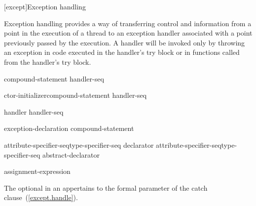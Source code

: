 [except]{Exception handling}%


%

\pnum
Exception handling provides a way of transferring control and information
from a point in the execution of a thread to an exception handler
associated with a point previously passed by the execution.
A handler will be invoked only by throwing an exception
in code executed in the handler's try block
or in functions called from the handler's try block.

%
%
\begin{bnf}
\br
     compound-statement handler-seq
\end{bnf}

%
%
\begin{bnf}
\br
     ctor-initializer\opt compound-statement handler-seq
\end{bnf}

\begin{bnf}
\br
    handler handler-seq\opt
\end{bnf}

%
%
\begin{bnf}
\br
     exception-declaration \terminal{)} compound-statement
\end{bnf}

\begin{bnf}
\br
    attribute-specifier-seq\opt type-specifier-seq declarator\br
    attribute-specifier-seq\opt type-specifier-seq abstract-declarator\opt\br
\end{bnf}

%
%
\begin{bnf}
\br
      assignment-expression\opt
\end{bnf}

The optional  in an 
appertains to the formal parameter of the catch clause~(\ref{except.handle}).

